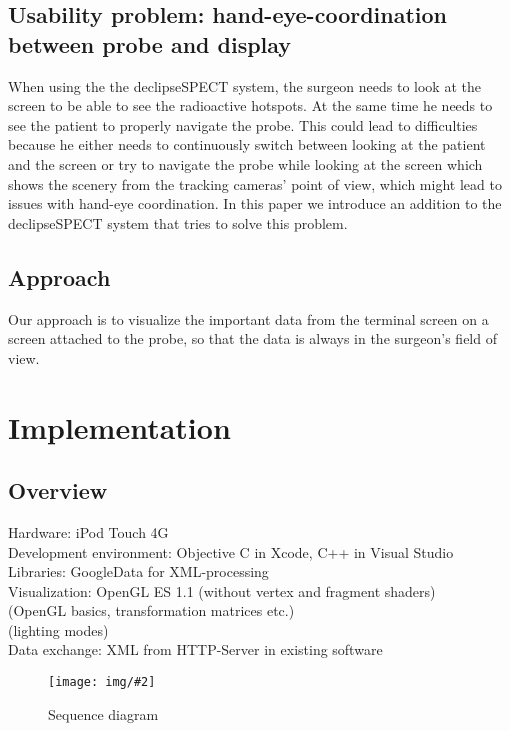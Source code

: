 \documentclass{scrartcl}
\newcommand{\red}[1]{{\color{red} #1}}
\newcommand{\graphic}[3][width=\linewidth] %
{
  \begin{figure}[h!t]
    \centering
    \texttt{[image: img/\#2]}
    \caption{#3}
    \label{fig:#2}
  \end{figure}
}
\begin{document}
\subsection{Usability problem: hand-eye-coordination between probe and display}
When using the the declipseSPECT system, the surgeon needs to look at the screen to be able to see the radioactive hotspots. At the same time he needs to see the patient to properly navigate the probe. This could lead to difficulties because he either needs to continuously switch between looking at the patient and the screen or try to navigate the probe while looking at the screen which shows the scenery from the tracking cameras' point of view, which might lead to issues with hand-eye coordination.
In this paper we introduce an addition to the declipseSPECT system that tries to solve this problem.


\subsection{Approach}
Our approach is to visualize the important data from the terminal screen on a screen attached to the probe, so that the data is always in the surgeon's field of view. 



\section{Implementation}

\subsection{Overview}
Hardware: iPod Touch 4G\\
Development environment: Objective C in Xcode, C++ in Visual Studio\\
Libraries: GoogleData for XML-processing\\
Visualization: OpenGL ES 1.1 (without vertex and fragment shaders)\\
\red{(OpenGL basics, transformation matrices etc.)\\
(lighting modes)}\\
Data exchange: XML from HTTP-Server in existing software\\
\graphic[scale=.8]{sequence-diagram}{Sequence diagram}
\end{document}
